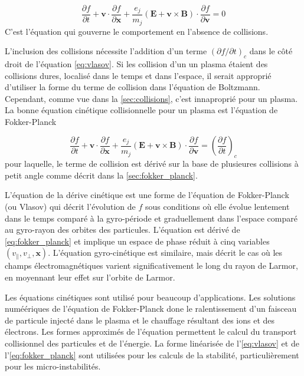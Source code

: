 \documentclass[main.tex]{subfiles}
\begin{document}
\begin{equation}
	\frac{\partial f}{\partial t} + \bm{v} \cdot \frac{\partial f}{\partial \bm{x}} + \frac{e_j}{m_j} \left( \bm{E} + \bm{v} \times \bm{B} \right) \cdot \frac{\partial f}{\partial \bm{v}} = 0
	\label{eq:vlasov}
\end{equation}
C'est l'équation qui gouverne le comportement en l'absence de collisions.

L'inclusion des collisions nécessite l'addition d'un terme \( \left( \partial f / \partial t \right)_c \) dans le côté droit de l'équation \ref{eq:vlasov}.
Si les collision d'un un plasma étaient des collisions dures, localisé dans le temps et dans l'espace, il serait approprié d'utiliser la forme du terme de collision dans l'équation de Boltzmann.
Cependant, comme vue dans la \autoref{sec:collisions}, c'est innaproprié pour un plasma.
La bonne équation cinétique collisionnelle pour un plasma est l'équation de Fokker-Planck

\begin{equation}
	\frac{\partial f}{\partial t} + \bm{v} \cdot \frac{\partial f}{\partial \bm{x}} + \frac{e_j}{m_j} \left( \bm{E} + \bm{v} \times \bm{B} \right) \cdot \frac{\partial f}{\partial \bm{v}} = \left( \frac{\partial f}{\partial t} \right)_c
	\label{eq:fokker_planck}
\end{equation}
pour laquelle, le terme de collision est dérivé sur la base de plusieures collisions à petit angle comme décrit dans la \autoref{sec:fokker_planck}.

L'équation de la dérive cinétique est une forme de l'équation de Fokker-Planck (ou Vlasov) qui décrit l'évolution de \( f \) sous conditions où elle évolue lentement dans le temps comparé à la gyro-période et graduellement dans l'espace comparé au gyro-rayon des orbites des particules.
L'équation est dérivé de \autoref{eq:fokker_planck} et implique un espace de phase réduit à cinq variables \( \left( v_\parallel, v_\perp, \bm{x} \right) \).
L'équation gyro-cinétique est similaire, mais décrit le cas où les champs électromagnétiques varient significativement le long du rayon de Larmor, en moyennant leur effet sur l'orbite de Larmor.

Les équations cinétiques sont utilisé pour beaucoup d'applications.
Les solutions numéériques de l'équation de Fokker-Planck done le ralentissement d'un faisceau de particule injecté dans le plasma et le chauffage résultant  des ions et des électrons.
Les formes approximés de l'équation permettent le calcul du transport collisionnel des particules et de l'énergie.
La forme linéarisée de l'\autoref{eq:vlasov} et de l'\autoref{eq:fokker_planck} sont utilisées pour les calculs de la stabilité, particulièrement pour les micro-instabilités.
\end{document}
